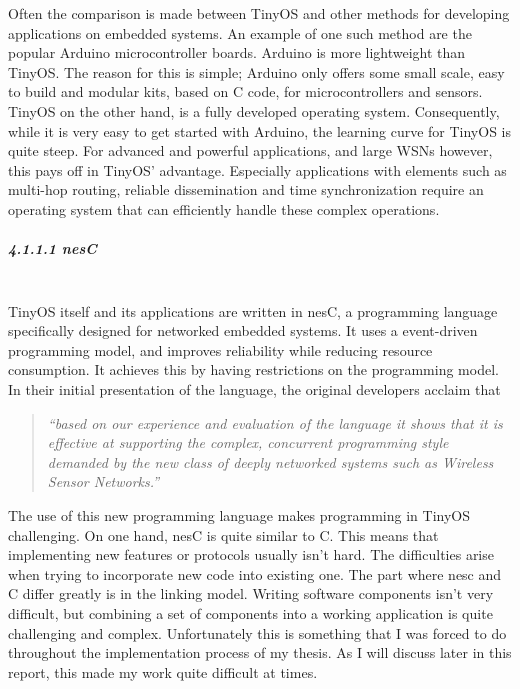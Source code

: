 Often the comparison is made between TinyOS and other methods for
developing applications on embedded systems. An example of one such
method are the popular Arduino microcontroller boards. Arduino is more
lightweight than TinyOS. The reason for this is simple; Arduino only
offers some small scale, easy to build and modular kits, based on C
code, for microcontrollers and sensors. TinyOS on the other hand, is a
fully developed operating system. Consequently, while it is very easy to
get started with Arduino, the learning curve for TinyOS is quite steep.
For advanced and powerful applications, and large WSNs however, this
pays off in TinyOS' advantage. Especially applications with elements
such as multi-hop routing, reliable dissemination and time
synchronization require an operating system that can efficiently handle
these complex operations\cite{levis2012experiences}.

\subparagraph{4.1.1.1 nesC\\\\}\label{nesc}

TinyOS itself and its applications are written in nesC, a programming
language specifically designed for networked embedded systems. It uses a
event-driven programming model, and improves reliability while reducing
resource consumption. It achieves this by having restrictions on the
programming model. In their initial presentation of the language, the
original developers acclaim that

\begin{quote}
\emph{``based on our experience and evaluation of the language it shows
that it is effective at supporting the complex, concurrent programming
style demanded by the new class of deeply networked systems such as
Wireless Sensor Networks\cite{gay2003nesc}.''}
\end{quote}

The use of this new programming language makes programming in TinyOS
challenging. On one hand, nesC is quite similar to C. This means that
implementing new features or protocols usually isn't hard. The
difficulties arise when trying to incorporate new code into existing
one. The part where nesc and C differ greatly is in the linking model.
Writing software components isn't very difficult, but combining a set of
components into a working application is quite challenging and complex.
Unfortunately this is something that I was forced to do throughout the
implementation process of my thesis. As I will discuss later in this
report, this made my work quite difficult at
times\cite{bucur2010software}.

